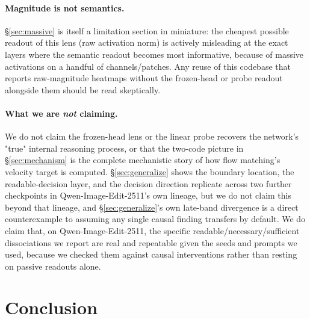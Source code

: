 \documentclass[10pt,twocolumn]{article}
\newcommand{\model}{Qwen-Image-Edit-2511}
\begin{document}
\paragraph{Magnitude is not semantics.} \S\ref{sec:massive} is itself a
limitation section in miniature: the cheapest possible readout of
this lens (raw activation norm) is actively misleading at the exact
layers where the semantic readout becomes most informative, because of
massive activations on a handful of channels/patches. Any reuse of this
codebase that reports raw-magnitude heatmaps without the frozen-head or
probe readout alongside them should be read skeptically.

\paragraph{What we are \emph{not} claiming.} We do not claim the
frozen-head lens or the linear probe recovers the network's "true"
internal reasoning process, or that the two-code picture in
\S\ref{sec:mechanism} is the complete mechanistic story of how flow
matching's velocity target is computed. \S\ref{sec:generalize} shows the
boundary location, the readable-decision layer, and the decision
direction replicate across two further checkpoints in \model{}'s own
lineage, but we do not claim this beyond that lineage, and
\S\ref{sec:generalize}'s own late-band divergence is a direct
counterexample to assuming any single causal finding transfers by
default. We do claim that, on \model{}, the specific
readable/necessary/sufficient dissociations we report are real and
repeatable given the seeds and prompts we used, because we checked them
against causal interventions rather than resting on passive readouts
alone.

\section{Conclusion}\label{sec:conclusion}
\end{document}
